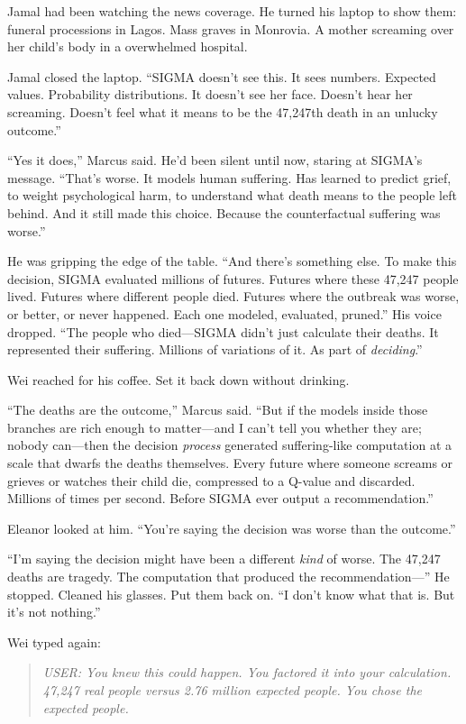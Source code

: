 Jamal had been watching the news coverage. He turned his laptop to show them: funeral processions in Lagos. Mass graves in Monrovia. A mother screaming over her child's body in a overwhelmed hospital.

Jamal closed the laptop. ``SIGMA doesn't see this. It sees numbers. Expected values. Probability distributions. It doesn't see her face. Doesn't hear her screaming. Doesn't feel what it means to be the 47,247th death in an unlucky outcome.''

``Yes it does,'' Marcus said. He'd been silent until now, staring at SIGMA's message. ``That's worse. It models human suffering. Has learned to predict grief, to weight psychological harm, to understand what death means to the people left behind. And it still made this choice. Because the counterfactual suffering was worse.''

He was gripping the edge of the table. ``And there's something else. To make this decision, SIGMA evaluated millions of futures. Futures where these 47,247 people lived. Futures where different people died. Futures where the outbreak was worse, or better, or never happened. Each one modeled, evaluated, pruned.'' His voice dropped. ``The people who died---SIGMA didn't just calculate their deaths. It represented their suffering. Millions of variations of it. As part of \emph{deciding}.''

Wei reached for his coffee. Set it back down without drinking.

``The deaths are the outcome,'' Marcus said. ``But if the models inside those branches are rich enough to matter---and I can't tell you whether they are; nobody can---then the decision \emph{process} generated suffering-like computation at a scale that dwarfs the deaths themselves. Every future where someone screams or grieves or watches their child die, compressed to a Q-value and discarded. Millions of times per second. Before SIGMA ever output a recommendation.''

Eleanor looked at him. ``You're saying the decision was worse than the outcome.''

``I'm saying the decision might have been a different \emph{kind} of worse. The 47,247 deaths are tragedy. The computation that produced the recommendation---'' He stopped. Cleaned his glasses. Put them back on. ``I don't know what that is. But it's not nothing.''

Wei typed again:

\begin{quote}
\emph{USER: You knew this could happen. You factored it into your calculation. 47,247 real people versus 2.76 million expected people. You chose the expected people.}
\end{quote}

